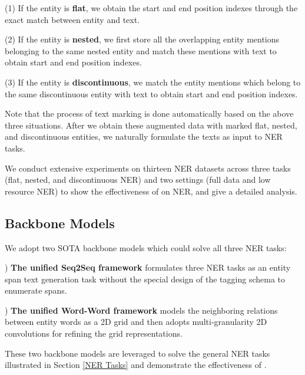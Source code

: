 (1) If the entity is \textbf{flat}, we obtain the start and end position indexes through the exact match between entity and text.

(2) If the entity is \textbf{nested}, we first store all the overlapping entity mentions belonging to the same nested entity and match these mentions with text to obtain start and end position indexes.

(3) If the entity is \textbf{discontinuous}, we match the entity mentions which belong to the same discontinuous entity with text to obtain start and end position indexes. 

Note that the process of text marking is done automatically based on the above three situations. After we obtain these augmented data with marked flat, nested, and discontinuous entities, we naturally formulate the texts as input to NER tasks.

\label{sec:experiments}

We conduct extensive experiments on thirteen NER datasets across three tasks (flat, nested, and discontinuous NER) and two settings (full data and low resource NER) to show the effectiveness of {\modelname} on NER, and give a detailed analysis.

\subsection{Backbone Models}
We adopt two SOTA backbone models which could solve all three NER tasks: 

) \textbf{The unified Seq2Seq framework} \cite{yan-etal-2021-unified-generative} formulates three NER tasks as an entity span text generation task without the special design of the tagging schema to enumerate spans. 

) \textbf{The unified Word-Word framework} \cite{li2022unified} models the neighboring relations between entity words as a 2D grid and then adopts multi-granularity 2D convolutions for refining the grid representations.

These two backbone models are leveraged to solve the general NER tasks illustrated in Section \ref{NER Tasks} and demonstrate the effectiveness of {\modelname}.

